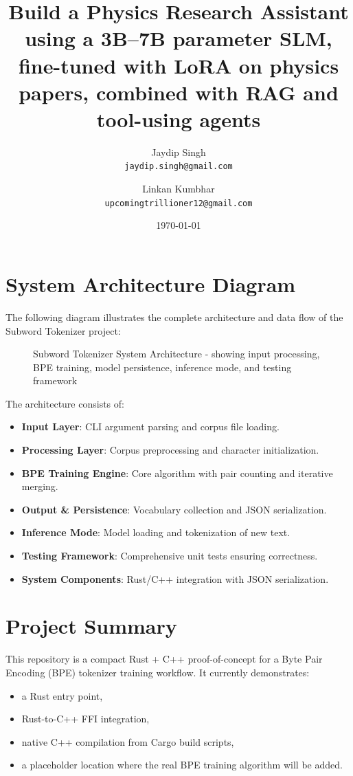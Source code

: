 \documentclass[11pt]{article}
\title{Build a Physics Research Assistant using a 3B--7B parameter SLM, fine-tuned with LoRA on physics papers, combined with RAG and tool-using agents}
\author{
Jaydip Singh \\
\texttt{jaydip.singh@gmail.com}
\and
Linkan Kumbhar \\
\texttt{upcomingtrillioner12@gmail.com}
}
\date{\today}
\begin{document}
\maketitle
\tableofcontents
\newpage

\section{System Architecture Diagram}

The following diagram illustrates the complete architecture and data flow of the Subword Tokenizer project:

\begin{figure}[H]
\centering
\caption{Subword Tokenizer System Architecture - showing input processing, BPE training, model persistence, inference mode, and testing framework}
\label{fig:architecture}
\end{figure}

The architecture consists of:
\begin{itemize}[leftmargin=1.2em]
  \item \textbf{Input Layer}: CLI argument parsing and corpus file loading.
  \item \textbf{Processing Layer}: Corpus preprocessing and character initialization.
  \item \textbf{BPE Training Engine}: Core algorithm with pair counting and iterative merging.
  \item \textbf{Output \& Persistence}: Vocabulary collection and JSON serialization.
  \item \textbf{Inference Mode}: Model loading and tokenization of new text.
  \item \textbf{Testing Framework}: Comprehensive unit tests ensuring correctness.
  \item \textbf{System Components}: Rust/C++ integration with JSON serialization.
\end{itemize}

\newpage

\section{Project Summary}
This repository is a compact Rust + C++ proof-of-concept for a Byte Pair Encoding (BPE) tokenizer training workflow. It currently demonstrates:
\begin{itemize}[leftmargin=1.2em]
  \item a Rust entry point,
  \item Rust-to-C++ FFI integration,
  \item native C++ compilation from Cargo build scripts,
  \item a placeholder location where the real BPE training algorithm will be added.
\end{itemize}
\end{document}
